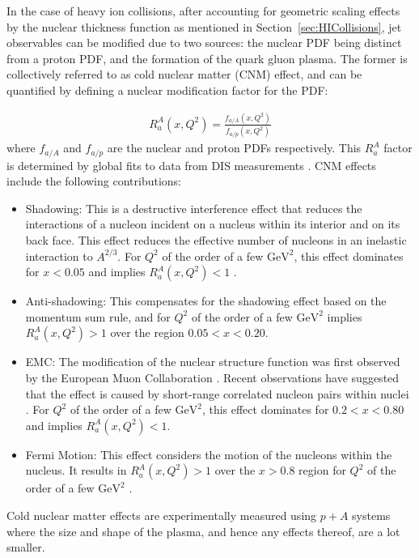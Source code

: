 In the case of heavy ion collisions, after accounting for geometric scaling effects by the nuclear thickness function as mentioned in Section~\ref{sec:HICollisions},  jet observables can be modified due to two sources: the nuclear PDF being distinct from a proton PDF, and the formation of the quark gluon plasma.
The former is collectively referred to as cold nuclear matter (CNM) effect, and can be quantified by defining a nuclear modification factor for the PDF:

\begin{align}
R_a^A (x, Q^2) = \frac{f_{a/A} (x, Q^2)}{f_{a/p}(x, Q^2)}
\end{align}
where $f_{a/A}$ and $f_{a/p}$ are the nuclear and proton PDFs respectively.
This $R_a^A$ factor is determined by global fits to data from DIS measurements \cite{PhysRevC.76.065207, PhysRevD.69.074028, Eskola_2009}.
CNM effects include the following contributions:
\begin{itemize}
\item Shadowing: This is a destructive interference effect that reduces the interactions of a nucleon incident on a nucleus within its interior and on its back face.
This effect reduces the effective number of nucleons in an inelastic interaction to $A^{2/3}$.
For $Q^2$ of the order of a few $\mathrm{GeV}^2$, this effect dominates for $x < 0.05$ and implies $R_a^A (x, Q^2) < 1$  \cite{PhysRevLett.64.1342}.
\item Anti-shadowing: This compensates for the shadowing effect based on the momentum sum rule, and for $Q^2$ of the order of a few $\mathrm{GeV}^2$ implies $R_a^A (x, Q^2) > 1$ over the region $0.05 < x < 0.20$.
\item EMC: The modification of the nuclear structure function was first observed by the European Muon Collaboration \cite{AUBERT1983275}.
Recent observations have suggested that the effect is caused by short-range correlated nucleon pairs within nuclei \cite{PhysRevC.85.047301}.
For $Q^2$ of the order of a few $\mathrm{GeV}^2$, this effect dominates for $0.2 < x < 0.80$ and implies $R_a^A (x, Q^2) < 1$.
\item  Fermi Motion: This effect considers the motion of the nucleons within the nucleus.
It results in $R_a^A (x, Q^2) > 1$  over the $x > 0.8$ region for $Q^2$ of the order of a few $\mathrm{GeV}^2$ \cite{Saito:1985ct}.
\end{itemize}

Cold nuclear matter effects are experimentally measured using $p+A$ systems where the size and shape of the plasma, and hence any effects thereof, are a lot smaller.


